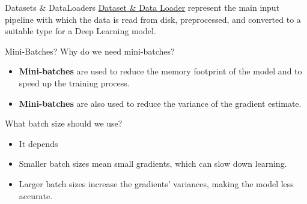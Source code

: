 \documentclass{beamer}
\begin{document}
\begin{frame}[fragile]{Datasets \& DataLoaders}
    \href{https://pytorch.org/docs/stable/generated/torch.nn.Module.html}{Dataset \& Data Loader} represent the main input pipeline with which the data is read from disk, preprocessed, and converted to a suitable type for a Deep Learning model.\\
\end{frame}

\begin{frame}[fragile]{Mini-Batches?}
    Why do we need mini-batches? \\
    \begin{itemize}
        \item \textbf{Mini-batches} are used to reduce the memory footprint of the model and to speed up the training process.
        \item \textbf{Mini-batches} are also used to reduce the variance of the gradient estimate.
    \end{itemize}
    What batch size should we use? \\
    \begin{itemize}
        \item It depends
        \item Smaller batch sizes mean small gradients, which can slow down learning.
        \item Larger batch sizes increase the gradients' variances, making the model less accurate.
    \end{itemize}
\end{frame}
\end{document}
